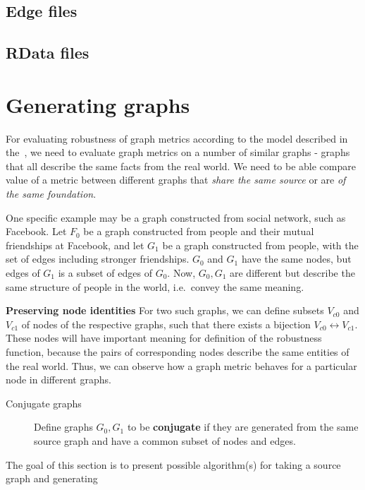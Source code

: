 \subsection{Edge files}

\subsection{RData files}


\section{Generating graphs}

For evaluating robustness of graph metrics according to the model described in the~, we need to evaluate graph metrics on a number of similar graphs - graphs that all describe the same facts from the real world.
We need to be able compare value of a metric between different graphs that \textit{share the same source} or are \textit{of the same foundation}.

One specific example may be a graph constructed from social network, such as Facebook.
Let $F_0$ be a graph constructed from people and their mutual friendships at Facebook, and let $G_1$ be a graph constructed from people, with the set of edges including stronger friendships. $G_0$ and $G_1$ have the same nodes, but edges of $G_1$ is a subset of edges of $G_0$.
Now, $G_0, G_1$ are different but describe the same structure of people in the world, i.e.\ convey the same meaning.

\textbf{Preserving node identities} For two such graphs, we can define subsets $V_{c0}$ and $V_{c1}$ of nodes of the respective graphs, such that there exists a bijection $V_{c0} \leftrightarrow V_{c1}$.
These nodes will have important meaning for definition of the robustness function, because the pairs of corresponding nodes describe the same entities of the real world.
Thus, we can observe how a graph metric behaves for a particular node in different graphs.

\begin{description}
    \item[Conjugate graphs] Define graphs $G_0, G_1$ to be \textbf{conjugate} if they are generated from the same source graph and have a common subset of nodes and edges.
\end{description}

The goal of this section is to present possible algorithm(s) for taking a source graph and generating

